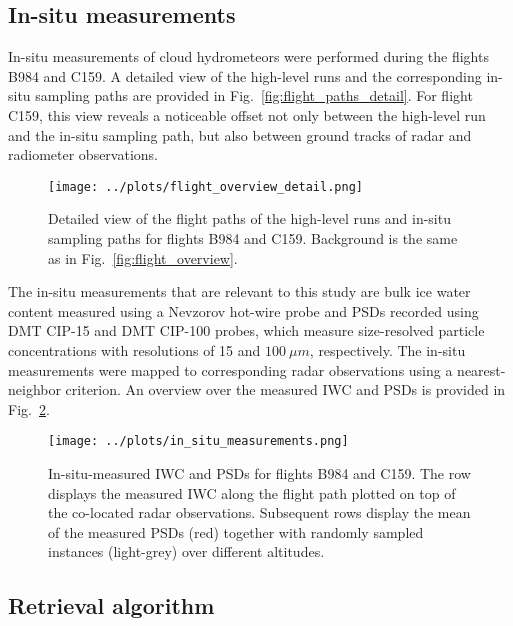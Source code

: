 \documentclass[journal abbreviation, manuscript]{copernicus}
\begin{document}
\subsection{In-situ measurements}
\label{sec:in_situ}

In-situ measurements of cloud hydrometeors were performed during  the flights
B984 and C159. A detailed view of the high-level runs and the corresponding
in-situ sampling paths are provided in Fig.~\ref{fig:flight_paths_detail}.
For flight C159, this view  reveals a noticeable offset not only between the
high-level run and the in-situ sampling path, but also between ground tracks
of radar and radiometer observations.


\begin{figure}[h!]
  \centering
  \texttt{[image: ../plots/flight\_overview\_detail.png]}
  \caption{
    Detailed view of the flight paths of the high-level runs and in-situ sampling
    paths for flights B984 and C159. Background is the same as in
    Fig.~\ref{fig:flight_overview}.
    }
  \label{fig:flight_oberview_detail}
\end{figure}

The in-situ measurements that are relevant to this study are bulk ice water
content measured using a Nevzorov hot-wire probe \citep{korolev13} and PSDs
recorded using DMT CIP-15 and DMT CIP-100 probes, which measure size-resolved
particle concentrations with resolutions of 15 and $100\ \unit{\mu m}$,
respectively. The in-situ measurements were mapped to corresponding radar
observations using a nearest-neighbor criterion. An overview over the measured
IWC and PSDs is provided in Fig.~\ref{fig:in_situ}.

\begin{figure}[hbpt!]
  \centering
  \texttt{[image: ../plots/in\_situ\_measurements.png]}
  \caption{
    In-situ-measured IWC and PSDs for flights B984 and C159. The row displays
    the measured IWC along the flight path plotted on top of the co-located radar
    observations. Subsequent rows display the mean of the measured PSDs (red)
    together with randomly sampled instances (light-grey) over different
    altitudes.
    }
  \label{fig:in_situ}
\end{figure}

\subsection{Retrieval algorithm}
\label{sec:synergistic_retrieval}
\end{document}
